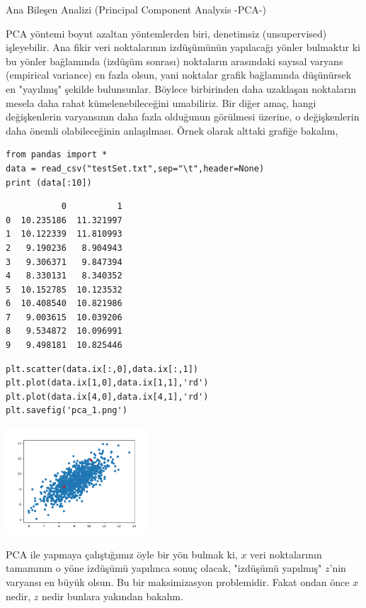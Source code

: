 \documentclass[12pt,fleqn]{article}\usepackage{../../common}
\begin{document}
Ana Bileşen Analizi (Principal Component Analysis -PCA-)

PCA yöntemi boyut azaltan yöntemlerden biri, denetimsiz (unsupervised)
işleyebilir. Ana fikir veri noktalarının izdüşümünün yapılacağı yönler
bulmaktır ki bu yönler bağlamında (izdüşüm sonrası) noktaların arasındaki
sayısal varyans (empirical variance) en fazla olsun, yani noktalar grafik
bağlamında düşünürsek en "yayılmış" şekilde bulunsunlar. Böylece
birbirinden daha uzaklaşan noktaların mesela daha rahat kümelenebileceğini
umabiliriz.  Bir diğer amaç, hangi değişkenlerin varyansının daha fazla
olduğunun görülmesi üzerine, o değişkenlerin daha önemli olabileceğinin
anlaşılması. Örnek olarak alttaki grafiğe bakalım,

\begin{verbatim}
from pandas import *
data = read_csv("testSet.txt",sep="\t",header=None)
print (data[:10])
\end{verbatim}

\begin{verbatim}
           0          1
0  10.235186  11.321997
1  10.122339  11.810993
2   9.190236   8.904943
3   9.306371   9.847394
4   8.330131   8.340352
5  10.152785  10.123532
6  10.408540  10.821986
7   9.003615  10.039206
8   9.534872  10.096991
9   9.498181  10.825446
\end{verbatim}

\begin{verbatim}
plt.scatter(data.ix[:,0],data.ix[:,1])
plt.plot(data.ix[1,0],data.ix[1,1],'rd')
plt.plot(data.ix[4,0],data.ix[4,1],'rd')
plt.savefig('pca_1.png')
\end{verbatim}

\includegraphics[height=4cm]{pca_1.png}

PCA ile yapmaya çalıştığımız öyle bir yön bulmak ki, $x$ veri
noktalarının tamamının o yöne izdüşümü yapılınca sonuç olacak,
"izdüşümü yapılmış" $z$'nin varyansı en büyük olsun. Bu bir
maksimizasyon problemidir. Fakat ondan önce $x$ nedir, $z$ nedir
bunlara yakından bakalım.
\end{document}
